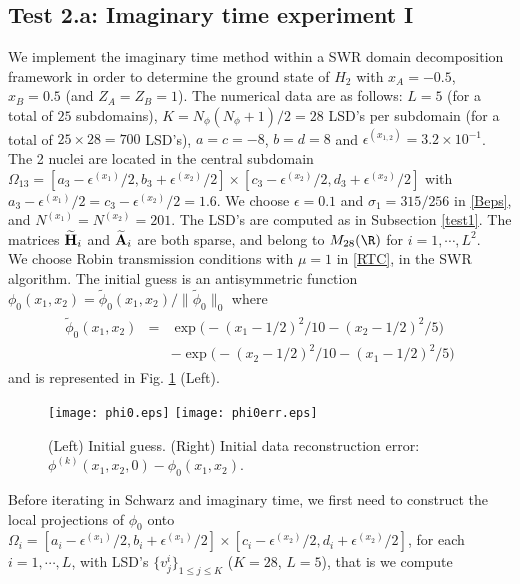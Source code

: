 \subsection{Test 2.a: Imaginary time experiment I}
We implement the imaginary time method within a SWR domain decomposition framework in order to determine the ground state of $H_2$ with $x_A=-0.5$, $x_B=0.5$ (and $Z_A=Z_B=1$). The numerical data are as follows: $L=5$ (for a total of $25$ subdomains), $K=N_{\phi}(N_{\phi}+1)/2=28$ LSD's per subdomain (for a total of $25\times 28 = 700$ LSD's),  $a=c=-8$, $b=d=8$ and $\epsilon^{(x_{1,2})}=3.2\times 10^{-1}$.  The 2 nuclei are located in the central subdomain $\Omega_{13}=[a_3-\epsilon^{(x_1)}/2,b_3+\epsilon^{(x_2)}/2]\times[c_3-\epsilon^{(x_2)}/2,d_3+\epsilon^{(x_2)}/2]$ with $a_3-\epsilon^{(x_1)}/2=c_3-\epsilon^{(x_2)}/2=1.6$. We choose $\epsilon=0.1$ and $\sigma_1=315/256$  in \eqref{Beps}, and $N^{(x_1)}=N^{(x_2)}=201$. The LSD's are computed as in Subsection \ref{test1}. The matrices $\widetilde{{\bf H}}_i$ and $\widetilde{{\bf A}}_i$ are both sparse, and belong to $M_{28}(\R)$ for $i=1,\cdots,L^2$. \\
We choose Robin transmission conditions with $\mu=1$ in \eqref{RTC}, in the SWR algorithm. The initial guess is an antisymmetric function $\phi_0(x_1,x_2)=\widetilde{\phi}_0(x_1,x_2)/\|\widetilde{\phi}_0\|_{0}$ where
\begin{eqnarray*}
\left.
\begin{array}{lcl}
\widetilde{\phi}_0(x_1,x_2) & =  & \exp\big(-(x_1-1/2)^2/10-(x_2-1/2)^2/5\big)\\
& & - \exp\big(-(x_2-1/2)^2/10-(x_1-1/2)^2/5\big)
\end{array}
\right.
\end{eqnarray*}
and is represented in Fig. \ref{phi0} (Left).
\begin{figure}[!ht]
\begin{center}
\hspace*{1mm}\texttt{[image: phi0.eps]}
\hspace*{1mm}\texttt{[image: phi0err.eps]}
\caption{(Left) Initial guess. (Right) Initial data reconstruction error: $\phi^{(k)}(x_1,x_2,0) - \phi_0(x_1,x_2)$.}
\label{phi0}
\end{center}
\end{figure}
Before iterating in Schwarz and imaginary time, we first need to construct the local projections of $\phi_0$ onto $\Omega_{i}=[a_i-\epsilon^{(x_1)}/2,b_i+\epsilon^{(x_1)}/2]\times[c_i-\epsilon^{(x_2)}/2,d_i+\epsilon^{(x_2)}/2]$, for each $i=1,\cdots,L$, with LSD's $\big\{v_j^{i}\big\}_{1\leq j \leq K}$ ($K=28$, $L=5$), that is we compute
